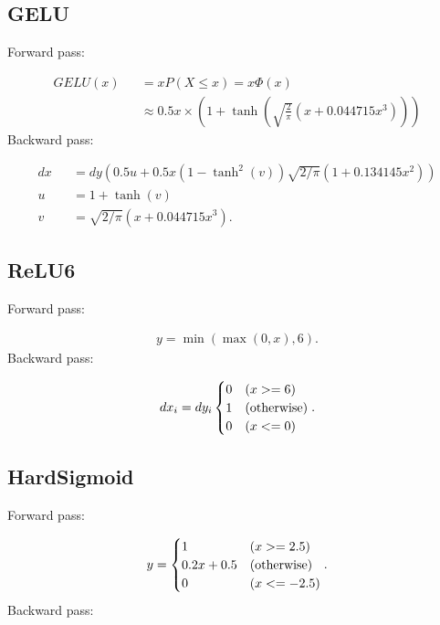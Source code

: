 \documentclass{article}
\begin{document}
\subsection{GELU}

Forward pass:

\begin{eqnarray}
  GELU(x) &&= x P(X \leq  x) = x \Phi (x)  \\
   && \approx 0.5x \times (1 + \tanh \left( \sqrt{\frac{2}{\pi}}(x + 0.044715 x^3) \right))
\end{eqnarray}
%
Backward pass:

\begin{eqnarray}
  dx &&= dy \left( 0.5u + 0.5x (1 - \tanh^2(v))\sqrt{2/\pi} (1 + 0.134145 x^2) \right) \\
  u &&= 1 + \tanh (v) \\
  v &&= \sqrt{2/\pi} (x + 0.044715 x^3).
\end{eqnarray}


\subsection{ReLU6}

Forward pass:

\begin{eqnarray}
  y = \min(\max(0,x), 6).
\end{eqnarray}
%
Backward pass:

\begin{eqnarray}
  dx_i = dy_i \begin{cases}
     0 & (x >= 6) \\
     1 & ({\rm otherwise}) \\
     0 & (x <= 0)
  \end{cases}.
\end{eqnarray}

\subsection{HardSigmoid}

Forward pass:

\begin{eqnarray}
  y = \begin{cases}
     1 & (x >= 2.5) \\
     0.2 x + 0.5 & ({\rm otherwise}) \\
     0 & (x <= -2.5)
  \end{cases}.
\end{eqnarray}
%
Backward pass:
\end{document}
